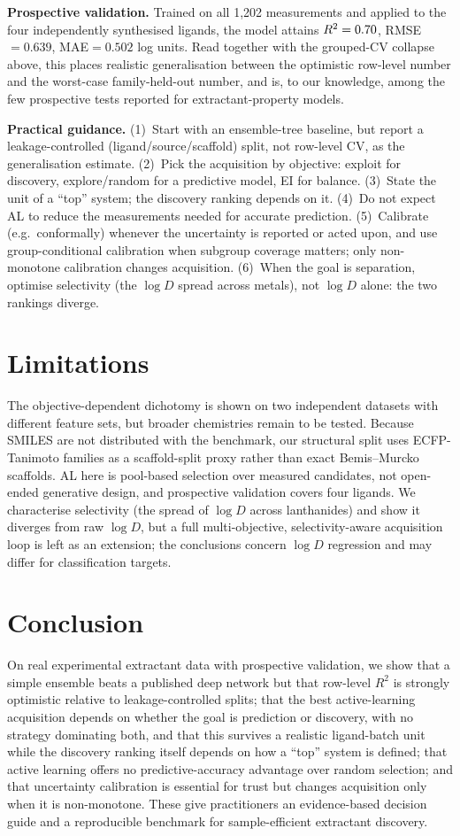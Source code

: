 \documentclass[journal=acsodf,manuscript=article]{achemso}
\begin{document}
\textbf{Prospective validation.} Trained on all 1{,}202 measurements and applied to the
four independently synthesised ligands, the model attains $R^2=0.70{}$,
RMSE$=0.639$, MAE$=0.502$ log units. Read together with the grouped-CV collapse above,
this places realistic generalisation between the optimistic row-level number and the
worst-case family-held-out number, and is, to our knowledge, among the few prospective
tests reported for extractant-property models.

\textbf{Practical guidance.} (1)~Start with an ensemble-tree baseline, but report a
leakage-controlled (ligand/source/scaffold) split, not row-level CV, as the
generalisation estimate. (2)~Pick the acquisition by objective: exploit for discovery,
explore/random for a predictive model, EI for balance. (3)~State the unit of a ``top''
system; the discovery ranking depends on it. (4)~Do not expect AL to reduce the
measurements needed for accurate prediction. (5)~Calibrate (e.g.\ conformally) whenever
the uncertainty is reported or acted upon, and use group-conditional calibration when
subgroup coverage matters; only non-monotone calibration changes acquisition.
(6)~When the goal is separation, optimise selectivity (the $\log D$ spread across
metals), not $\log D$ alone: the two rankings diverge.

\section{Limitations}
The objective-dependent dichotomy is shown on two independent datasets with different
feature sets, but broader chemistries remain to be tested. Because SMILES are not
distributed with the benchmark, our structural split uses ECFP-Tanimoto families as a
scaffold-split proxy rather than exact Bemis--Murcko scaffolds. AL here is pool-based
selection over measured candidates, not open-ended generative design, and prospective
validation covers four ligands. We characterise selectivity (the spread of $\log D$
across lanthanides) and show it diverges from raw $\log D$, but a full multi-objective,
selectivity-aware acquisition loop is left as an extension; the conclusions concern
$\log D$ regression and may differ for classification targets.

\section{Conclusion}
On real experimental extractant data with prospective validation, we show that a
simple ensemble beats a published deep network but that row-level $R^2$ is strongly
optimistic relative to leakage-controlled splits; that the best active-learning
acquisition depends on whether the goal is prediction or discovery, with no strategy
dominating both, and that this survives a realistic ligand-batch unit while the
discovery ranking itself depends on how a ``top'' system is defined; that active
learning offers no predictive-accuracy advantage over random selection; and that
uncertainty calibration is essential for trust but changes acquisition only when it is
non-monotone. These give practitioners an evidence-based decision guide and a
reproducible benchmark for sample-efficient extractant discovery.
\end{document}
